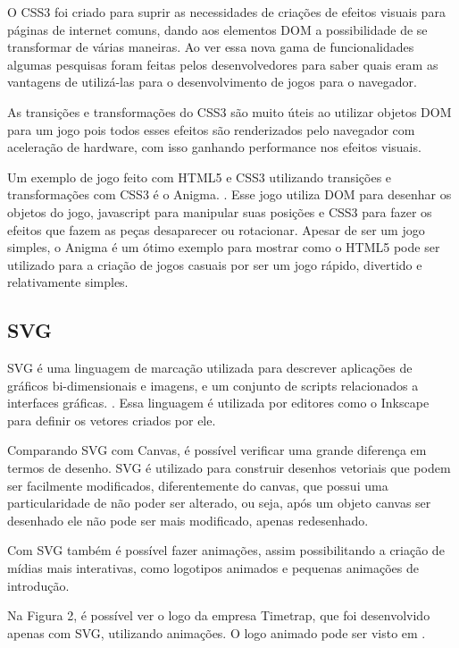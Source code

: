 O CSS3 foi criado para suprir as necessidades de criações de efeitos
visuais para páginas de internet comuns, dando aos elementos DOM a
possibilidade de se transformar de várias maneiras. Ao ver essa nova
gama de funcionalidades algumas pesquisas foram feitas pelos
desenvolvedores para saber quais eram as vantagens de utilizá-las para
o desenvolvimento de jogos para o navegador.

As transições e transformações do CSS3 são muito úteis ao utilizar
objetos DOM para um jogo pois todos esses efeitos são renderizados
pelo navegador com aceleração de hardware, com isso ganhando
performance nos efeitos visuais.

Um exemplo de jogo feito com HTML5 e CSS3 utilizando transições e
transformações com CSS3 é o Anigma. \cite{website:anigma}. Esse jogo
utiliza DOM para desenhar os objetos do jogo, javascript para
manipular suas posições e CSS3 para fazer os efeitos que fazem as
peças desaparecer ou rotacionar. Apesar de ser um jogo simples, o
Anigma é um ótimo exemplo para mostrar como o HTML5 pode ser utilizado
para a criação de jogos casuais por ser um jogo rápido, divertido e
relativamente simples.

\subsection{SVG}

SVG é uma linguagem de marcação utilizada para descrever aplicações de gráficos
bi-dimensionais e imagens, e um conjunto de scripts relacionados a
interfaces gráficas. \cite{website:w3csvg}. Essa linguagem é utilizada por
editores como o Inkscape para definir os vetores criados por ele.

Comparando SVG com Canvas, é possível verificar uma grande diferença
em termos de desenho. SVG é utilizado para construir desenhos
vetoriais que podem ser facilmente modificados, diferentemente do
canvas, que possui uma particularidade de não poder ser alterado, ou
seja, após um objeto canvas ser desenhado ele não pode ser mais
modificado, apenas redesenhado.

Com SVG também é possível fazer animações, assim possibilitando a
criação de mídias mais interativas, como logotipos animados e pequenas
animações de introdução.

Na Figura 2, é possível ver o logo da empresa
Timetrap, que foi desenvolvido apenas com SVG, utilizando animações. O
logo animado pode ser visto em .

